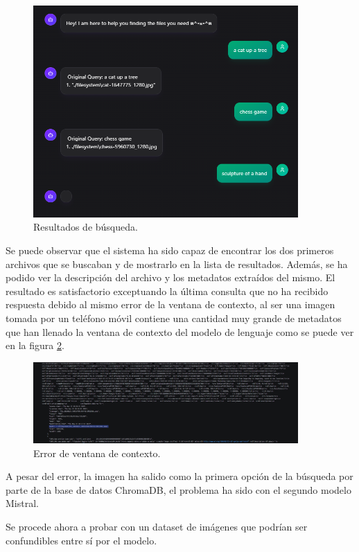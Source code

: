 \begin{figure}[H]
\centering
\includegraphics[width=0.9\textwidth]{archivos/web_multiple_results.png}
\caption[Resultados de búsqueda]{Resultados de búsqueda.}
\label{fig:cat_example_image}
\end{figure}

Se puede observar que el sistema ha sido capaz de encontrar los dos primeros archivos que se buscaban y de mostrarlo en la lista de resultados. Además, se ha podido ver la descripción del archivo y los metadatos extraídos del mismo. El resultado es satisfactorio exceptuando la última consulta que no ha recibido respuesta debido al mismo error de la ventana de contexto, al ser una imagen tomada por un teléfono móvil contiene una cantidad muy grande de metadatos que han llenado la ventana de contexto del modelo de lenguaje como se puede ver en la figura \ref{fig:context_window_error}.
\begin{figure}[H]
\centering
\includegraphics[width=0.9\textwidth]{archivos/context_window_error.png}
\caption[Error de ventana de contexto]{Error de ventana de contexto.}
\label{fig:context_window_error}
\end{figure}

A pesar del error, la imagen ha salido como la primera opción de la búsqueda por parte de la base de datos ChromaDB, el problema ha sido con el segundo modelo Mistral.

Se procede ahora a probar con un dataset de imágenes que podrían ser confundibles entre sí por el modelo.

